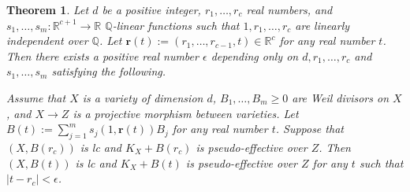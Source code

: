 \documentclass[11pt]{amsart}
\numberwithin{equation}{section}
\newcommand{\Qq}{\mathbb{Q}}
\newcommand{\Rr}{\mathbb{R}}
\newtheorem{thm}{Theorem}[section]
\theoremstyle{definition}
\theoremstyle{definition}
\begin{document}
\begin{thm}\label{thm: one variable psd polytope}
Let $d$ be a positive integer, $r_1,\dots,r_c$ real numbers, and $s_1,\dots,s_m:\Rr^{c+1}\rightarrow\Rr$ $\Qq$-linear functions such that $1,r_1,\dots,r_c$ are linearly independent over $\Qq$. Let $\bm{r}(t):=(r_1,\dots,r_{c-1},t)\in\Rr^c$ for any real number $t$. Then there exists a positive real number $\epsilon$ depending only on $d,r_1,\dots,r_c$ and $s_1,\dots,s_m$ satisfying the following. 

Assume that $X$ is a variety of dimension $d$, $B_1,\dots,B_m\geq 0$ are Weil divisors on $X$, and $X\to Z$ is a projective morphism between varieties. Let $B(t):=\sum_{j=1}^ms_j(1,\bm{r}(t))B_j$ for any real number $t$. Suppose that $(X,B(r_c))$ is lc and $K_X+B(r_c)$ is pseudo-effective over $Z$. Then $(X,B(t))$ is lc and $K_X+B(t)$ is pseudo-effective over $Z$ for any $t$ such that $|t-r_c|<\epsilon$.
\end{thm}
\end{document}

